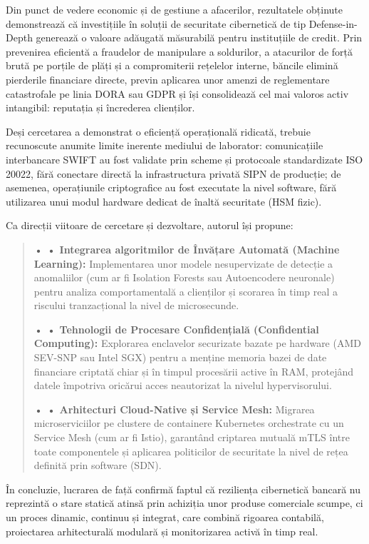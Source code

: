 \documentclass[
]{article}
\begin{document}
Din punct de vedere economic și de gestiune a afacerilor, rezultatele
obținute demonstrează că investițiile în soluții de securitate
cibernetică de tip Defense-in-Depth generează o valoare adăugată
măsurabilă pentru instituțiile de credit. Prin prevenirea eficientă a
fraudelor de manipulare a soldurilor, a atacurilor de forță brută pe
porțile de plăți și a compromiterii rețelelor interne, băncile elimină
pierderile financiare directe, previn aplicarea unor amenzi de
reglementare catastrofale pe linia DORA sau GDPR și își consolidează cel
mai valoros activ intangibil: reputația și încrederea clienților.

Deși cercetarea a demonstrat o eficiență operațională ridicată, trebuie
recunoscute anumite limite inerente mediului de laborator: comunicațiile
interbancare SWIFT au fost validate prin scheme și protocoale
standardizate ISO 20022, fără conectare directă la infrastructura
privată SIPN de producție; de asemenea, operațiunile criptografice au
fost executate la nivel software, fără utilizarea unui modul hardware
dedicat de înaltă securitate (HSM fizic).

Ca direcții viitoare de cercetare și dezvoltare, autorul își propune:

\begin{quote}
\textbf{• • Integrarea algoritmilor de Învățare Automată (Machine
Learning):} Implementarea unor modele nesupervizate de detecție a
anomaliilor (cum ar fi Isolation Forests sau Autoencodere neuronale)
pentru analiza comportamentală a clienților și scorarea în timp real a
riscului tranzacțional la nivel de microsecunde.

\textbf{• • Tehnologii de Procesare Confidențială (Confidential
Computing):} Explorarea enclavelor securizate bazate pe hardware (AMD
SEV-SNP sau Intel SGX) pentru a menține memoria bazei de date financiare
criptată chiar și în timpul procesării active în RAM, protejând datele
împotriva oricărui acces neautorizat la nivelul hypervisorului.

\textbf{• • Arhitecturi Cloud-Native și Service Mesh:} Migrarea
microserviciilor pe clustere de containere Kubernetes orchestrate cu un
Service Mesh (cum ar fi Istio), garantând criptarea mutuală mTLS între
toate componentele și aplicarea politicilor de securitate la nivel de
rețea definită prin software (SDN).
\end{quote}

În concluzie, lucrarea de față confirmă faptul că reziliența cibernetică
bancară nu reprezintă o stare statică atinsă prin achiziția unor produse
comerciale scumpe, ci un proces dinamic, continuu și integrat, care
combină rigoarea contabilă, proiectarea arhitecturală modulară și
monitorizarea activă în timp real.
\end{document}
